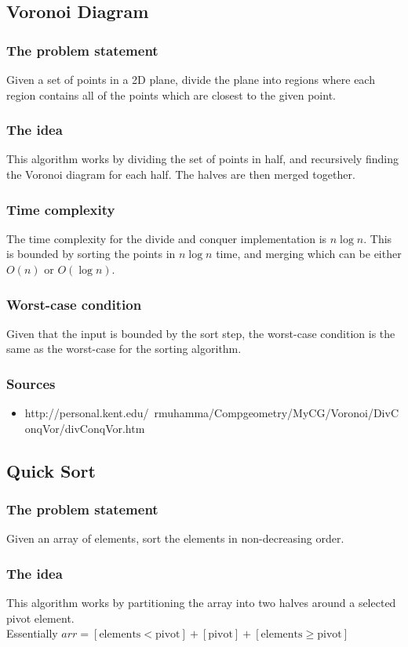 \documentclass{article}
\begin{document}
\subsection{Voronoi Diagram}
\subsubsection{The problem statement}
Given a set of points in a 2D plane, divide the plane into regions where each region contains all of the points which are closest to the given point.
\subsubsection{The idea}
This algorithm works by dividing the set of points in half, and recursively finding the Voronoi diagram for each half.
The halves are then merged together.
\subsubsection{Time complexity}
The time complexity for the divide and conquer implementation is \(n \log n\).
This is bounded by sorting the points in \(n \log n\) time, and merging which can be either \(O(n)\) or \(O(\log n)\).
\subsubsection{Worst-case condition}
Given that the input is bounded by the sort step, the worst-case condition is the same as the worst-case for the sorting algorithm.
\subsubsection{Sources}
\begin{itemize}
    \item http://personal.kent.edu/~rmuhamma/Compgeometry/MyCG/Voronoi/DivConqVor/divConqVor.htm
\end{itemize}
\subsection{Quick Sort}
\subsubsection{The problem statement}
Given an array of elements, sort the elements in non-decreasing order.
\subsubsection{The idea}
This algorithm works by partitioning the array into two halves around a selected pivot element. \\
Essentially \(arr = [\text{elements} < \text{pivot}] + [\text{pivot}] + [\text{elements} \ge \text{pivot}]\) \\
\end{document}
